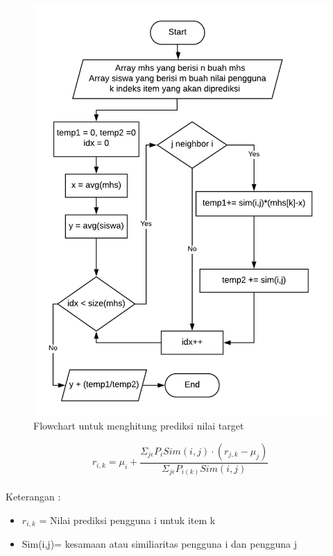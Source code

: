 \documentclass[a4paper,twoside]{article}
\begin{document}
\begin{enumerate}
\begin{enumerate}
	
	\begin{figure}[H]
		\centering
		\includegraphics[scale=0.6]{predict}
		\caption{Flowchart untuk menghitung prediksi nilai target}
	\end{figure}		
	
	\begin{equation}
		r_{i,k} = \mu_{i} + \frac{\Sigma _{j \epsilon} P_{i} Sim(i,j)\cdot (r_{j,k} - \mu_{j})}{\Sigma _{j \epsilon} P_{i(k)} Sim(i,j)}
	\end{equation}\leavevmode \\
	
	Keterangan :
	\begin{itemize}
		\item $r_{i,k}$ = Nilai prediksi pengguna i untuk item k
		
		\item Sim(i,j)= kesamaan atau similiaritas pengguna i dan pengguna j
		

\end{itemize}
\end{enumerate}
\end{enumerate}
\end{document}
